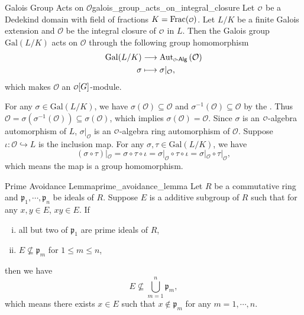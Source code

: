 \begin{proposition}{Galois Group Acts on $\mathcal{O}$}{galois_group_acts_on_integral_closure}
    Let $\mathcalo$ be a Dedekind domain with field of fractions $K=\mathrm{Frac}(\mathcalo)$. Let $L/K$ be a finite Galois extension and $\mathcal{O}$ be the integral closure of $\mathcalo$ in $L$. Then the Galois group $\mathrm{Gal}(L/K)$ acts on $\mathcal{O}$ through the following group homomorphism
    \begin{align*}
        \mathrm{Gal}(L/K)&\longrightarrow \mathrm{Aut}_{\mathcalo\text{-}\mathsf{Alg}}\left(\mathcal{O}\right)\\
        \sigma&\longmapsto \sigma|_{\mathcal{O}},
    \end{align*}
    which makes $\mathcal{O}$ an $\mathcalo[G]$-module.
\end{proposition}
\begin{prf}
    For any $\sigma\in \mathrm{Gal}(L/K)$, we have $\sigma(\mathcal{O})\subseteq \mathcal{O}$ and $ \sigma^{-1}(\mathcal{O})\subseteq \mathcal{O}$ by the . Thus $\mathcal{O}= \sigma(\sigma^{-1}(\mathcal{O}))\subseteq \sigma(\mathcal{O})$, which implies $\sigma(\mathcal{O})=\mathcal{O}$. Since $\sigma$ is an $\mathcalo$-algebra automorphism of $L$, $\sigma|_{\mathcal{O}}$ is an $\mathcalo$-algebra ring automorphism of $\mathcal{O}$. Suppose $\iota:\mathcal{O}\hookrightarrow L$ is the inclusion map. For any $\sigma,\tau\in \mathrm{Gal}(L/K)$, we have
    \[
        (\sigma\circ \tau)|_{\mathcal{O}}=\sigma\circ \tau\circ \iota=\sigma|_{\mathcal{O}} \circ \tau\circ \iota =\sigma|_{\mathcal{O}}\circ \tau|_{\mathcal{O}},
    \]
    which means the map is a group homomorphism.
\end{prf}

\begin{lemma}{Prime Avoidance Lemma}{prime_avoidance_lemma}
    Let $R$ be a commutative ring and $\mathfrak{p}_1,\cdots,\mathfrak{p}_n$ be ideals of $R$. Suppose $E$ is a additive subgroup of $R$ such that for any $x,y \in E$, $xy \in E$. If
    \begin{enumerate}[(i)]
        \item all but two of $\mathfrak{p}_1$ are prime ideals of $R$,
        \item $E \not\subseteq \mathfrak{p}_m$ for $1\le m\le n$,
    \end{enumerate}
    then we have 
    \[
    E \not\subseteq \bigcup_{m=1}^n \mathfrak{p}_m,
    \]
    which means there exists $x\in E$ such that $x\notin \mathfrak{p}_m$ for any $m=1,\cdots,n$.
\end{lemma}

